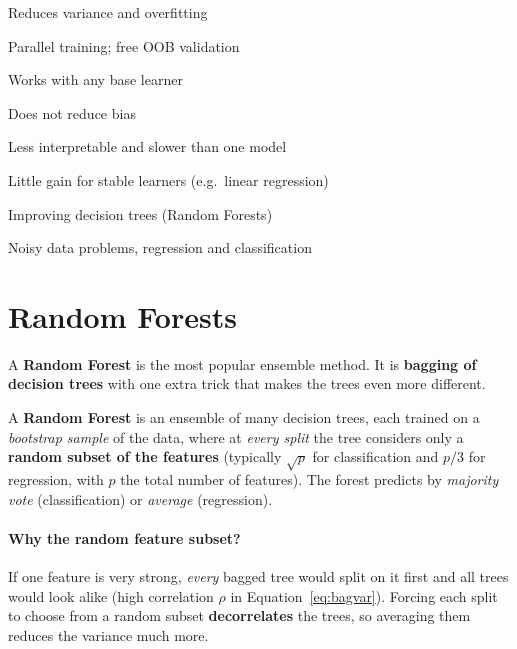 {\item Reduces variance and overfitting
 \item Parallel training; free OOB validation
 \item Works with any base learner}
{\item Does not reduce bias
 \item Less interpretable and slower than one model
 \item Little gain for stable learners (e.g.\ linear regression)}
{\item Improving decision trees (Random Forests)
 \item Noisy data problems, regression and classification}

\section{Random Forests}

A \textbf{Random Forest} is the most popular ensemble method. It is \textbf{bagging of decision trees} with one extra trick that makes the trees even more different.

\begin{definition}
A \textbf{Random Forest} is an ensemble of many decision trees, each trained on a \emph{bootstrap sample} of the data, where at \emph{every split} the tree considers only a \textbf{random subset of the features} (typically $\sqrt p$ for classification and $p/3$ for regression, with $p$ the total number of features). The forest predicts by \emph{majority vote} (classification) or \emph{average} (regression).
\end{definition}

\paragraph{Why the random feature subset?} If one feature is very strong, \emph{every} bagged tree would split on it first and all trees would look alike (high correlation $\rho$ in Equation~\eqref{eq:bagvar}). Forcing each split to choose from a random subset \textbf{decorrelates} the trees, so averaging them reduces the variance much more.

